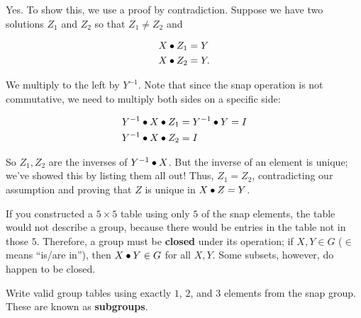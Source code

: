 \documentclass[../gatm_answers.tex]{subfiles}
\begin{document}
Yes. To show this, we use a proof by contradiction. Suppose we have two solutions $Z_1$ and $Z_2$ so that $Z_1\neq Z_2$ and

\begin{align*}
X\bullet Z_1 &= Y \\
X\bullet Z_2 &= Y.
\end{align*}

We multiply to the left by $Y^{-1}$. Note that since the snap operation is not commutative, we need to multiply both sides on a specific side:

\begin{align*}
Y^{-1} \bullet X\bullet Z_1 &= Y^{-1} \bullet Y = I \\
Y^{-1} \bullet X\bullet Z_2 &= I
\end{align*}

So $Z_1,Z_2$ are the inverses of $Y^{-1}\bullet X$. But the inverse of an element is unique; we've showed this by listing them all out! Thus, $Z_1=Z_2$, contradicting our assumption and proving that $Z$ is unique in $X\bullet Z = Y$.

\begin{outer_problem}
	\item If you constructed a $5\times 5$ table using only $5$ of the snap elements, the table would not describe a group, because there would be entries in the table not in those $5$.
	      Therefore, a group must be \textbf{closed} under its operation; if $X,Y\in G$ ($\in$ means ``is/are in''), then $X\bullet Y\in G$ for all $X,Y$.
	      Some subsets, however, do happen to be closed.

	      Write valid group tables using exactly $1$, $2$, and $3$ elements from the snap group. These are known as \textbf{subgroups}.\label{prob:group_definition_end}
\end{outer_problem}
\end{document}
